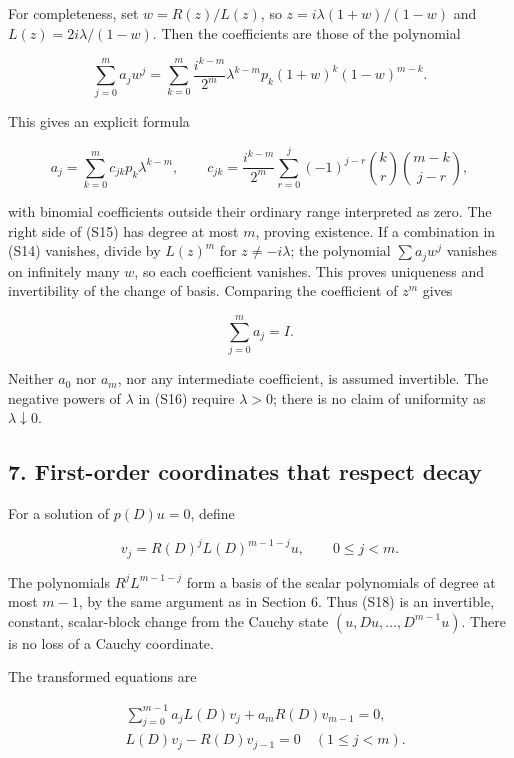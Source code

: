 \documentclass[
  11pt,
]{article}
\begin{document}
For completeness, set \(w=R(z)/L(z)\), so \(z=i\lambda(1+w)/(1-w)\) and
\(L(z)=2i\lambda/(1-w)\). Then the coefficients are those of the
polynomial

\[
\sum_{j=0}^m a_jw^j
=\sum_{k=0}^m\frac{i^{k-m}}{2^m}\lambda^{k-m}
 p_k(1+w)^k(1-w)^{m-k}.                                  \tag{S15}
\]

This gives an explicit formula

\[
a_j=\sum_{k=0}^m c_{jk}p_k\lambda^{k-m},\qquad
c_{jk}=\frac{i^{k-m}}{2^m}
\sum_{r=0}^{j}(-1)^{j-r}
\binom{k}{r}\binom{m-k}{j-r},                             \tag{S16}
\]

with binomial coefficients outside their ordinary range interpreted as
zero. The right side of (S15) has degree at most \(m\), proving
existence. If a combination in (S14) vanishes, divide by \(L(z)^m\) for
\(z\ne-i\lambda\); the polynomial \(\sum a_jw^j\) vanishes on infinitely
many \(w\), so each coefficient vanishes. This proves uniqueness and
invertibility of the change of basis. Comparing the coefficient of
\(z^m\) gives

\[
\sum_{j=0}^m a_j=I.                                      \tag{S17}
\]

Neither \(a_0\) nor \(a_m\), nor any intermediate coefficient, is
assumed invertible. The negative powers of \(\lambda\) in (S16) require
\(\lambda>0\); there is no claim of uniformity as
\(\lambda\downarrow0\).

\subsection{7. First-order coordinates that respect
decay}\label{first-order-coordinates-that-respect-decay}

For a solution of \(p(D)u=0\), define

\[
v_j=R(D)^jL(D)^{m-1-j}u,\qquad 0\leq j<m.                \tag{S18}
\]

The polynomials \(R^jL^{m-1-j}\) form a basis of the scalar polynomials
of degree at most \(m-1\), by the same argument as in Section 6. Thus
(S18) is an invertible, constant, scalar-block change from the Cauchy
state \((u,Du,\ldots,D^{m-1}u)\). There is no loss of a Cauchy
coordinate.

The transformed equations are

\[
\begin{aligned}
&\sum_{j=0}^{m-1}a_jL(D)v_j+a_mR(D)v_{m-1}=0,\\
&L(D)v_j-R(D)v_{j-1}=0\quad(1\leq j<m).
\end{aligned}                                             \tag{S19}
\]
\end{document}

